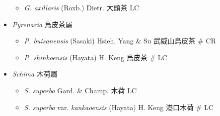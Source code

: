 \begin{itemize}
  \begin{itemize}
        \item[] \textit{G. axillaris} (Roxb.) Dietr.  大頭茶   LC
  \end{itemize}
 \item[] \textit{Pyrenaria} 烏皮茶屬
                                
  \begin{itemize}
        \item[] \textit{P. buisanensis} (Sasaki) Hsieh, Yang \& Su  武威山烏皮茶  \# CR
        \item[] \textit{P. shinkoensis} (Hayata) H. Keng  烏皮茶  \# LC
  \end{itemize}
 \item[] \textit{Schima} 木荷屬
                                
  \begin{itemize}
        \item[] \textit{S. superba} Gard. \& Champ.  木荷   LC
        \item[] \textit{S. superba} var. \textit{kankaoensis} (Hayata) H. Keng  港口木荷  \# LC
  \end{itemize}
  \end{itemize}
